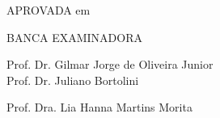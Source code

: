 \thispagestyle{empty}
\vspace*{2.0cm}
\begin{center}\large
  \imprimirautor
\end{center}
\vfill
\begin{center}
     \textbf{\large \imprimirtitulo}
\end{center}
\vfill
\begin{flushright}
\parbox[t]{9cm}{
\SingleSpacing
	\imprimirpreambulo
}
\end{flushright}

\vspace{0.5cm}
\noindent APROVADA em  \hrulefill\
\vspace{1.0cm}

\begin{center}
BANCA EXAMINADORA
\end{center}
\begin{flushright}
\begin{minipage}[t]{12cm}

Prof. Dr. Gilmar Jorge de Oliveira Junior \hrulefill\\


Prof. Dr. Juliano Bortolini \hrulefill\\
\textbf{}

Prof. Dra. Lia Hanna Martins Morita \hrulefill\\


\end{minipage}
\end{flushright}
\vfill

\centerline{\large \imprimirlocal}
\centerline{\large \imprimirdata}
\vspace*{1cm} 